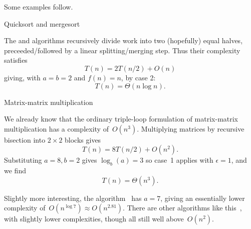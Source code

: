 Some examples follow.

 {Quicksort and mergesort}

The  and  algorithms
recursively divide work into two (hopefully) equal halves,
preceeded/followed by a linear splitting/merging step.
Thus their complexity satisfies
\[ T(n) = 2T(n/2) + O(n) \]
giving, with $a=b=2$ and $f(n)=n$, by case 2:
\[ T(n) = \Theta( n\log n ). \]

 {Matrix-matrix multiplication}

We already know that the ordinary triple-loop formulation of
matrix-matrix multiplication has a complexity of~$O(n^3)$.
Multiplying matrices by recursive bisection into $2\times 2$ blocks
gives
\[ T(n) = 8T(n/2) + O(n^2). \]
Substituting $a=8,b=2$ gives $\log_b(a)=3$
so case~1 applies with $\epsilon=1$,
and we find
\[ T(n) = \Theta( n^3 ). \]

Slightly more interesting, the
algorithm~\cite{St:gaussnotoptimal}
has $a=7$,
giving an essentially lower complexity of~$O(n^{\log 7}) \approx O(n^{2.81})$.
There are other algorithms like this~\cite{Pa:combinations},
with slightly lower complexities,
though all still well above~$O(n^2)$.

